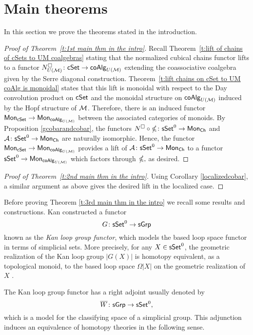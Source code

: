 
\section{Main theorems}

In this section we prove the theorems stated in the introduction. 

\begin{proof}[Proof of Theorem~\ref{t:1st main thm in the intro}]
    Recall Theorem~\ref{t:lift of chains of cSets to UM coalgebras} stating that the normalized cubical chains functor lifts to a functor $N^{\square}_{U(\mathcal{M})} \colon \mathsf{cSet} \to \mathsf{coAlg}_{U(\mathcal{M})}$ extending the coassociative coalgebra given by the Serre diagonal construction.
    Theorem~\ref{t:lift chains on cSet to UM coAlg is monoidal} states that this lift is  monoidal with respect to the Day convolution product on $\mathsf{cSet}$ and the monoidal structure on $\mathsf{coAlg}_{U(\mathcal{M})}$ induced by the Hopf structure of $\mathcal{M}$.
    Therefore, there is an induced functor $\mathsf{Mon}_{\mathsf{cSet}} \to \mathsf{Mon}_{\mathsf{coAlg}_{U(\mathcal{M})}}$ between the associated categories of monoids.
    By Proposition \ref{gcobarandcobar}, the functors $N^{\square} \circ \mathbb{\Omega} \colon \mathsf{sSet}^0 \to \mathsf{Mon}_{\mathsf{Ch}}$ and $\mathcal{A} \colon \mathsf{sSet}^0 \to \mathsf{Mon}_{\mathsf{Ch}}$ are naturally isomorphic.
    Hence, the functor $\mathsf{Mon}_{\mathsf{cSet}} \to \mathsf{Mon}_{\mathsf{coAlg}_{U(\mathcal{M})}}$ provides a lift of $\mathcal{A} \colon \mathsf{sSet}^0 \to \mathsf{Mon}_{\mathsf{Ch}}$ to a functor  $\mathsf{sSet}^0 \to \mathsf{Mon}_{\mathsf{coAlg}_{U(\mathcal{M})}}$ which factors through $\mathbb{\Omega},$ as desired.
\end{proof}

\begin{proof}[Proof of Theorem~\ref{t:2nd main thm in the intro}]
Using Corollary \ref{localizedcobar}, a similar argument as above gives the desired lift in the localized case. 
\end{proof}

Before proving Theorem \ref{t:3rd main thm in the intro} we recall some results and constructions. 
Kan constructed a functor $$G\colon \mathsf{sSet}^0 \to \mathsf{sGrp}$$ known as the \textit{Kan loop group functor}, which models the based loop space functor in terms of simplicial sets. More precisely, for any $X \in \mathsf{sSet}^0$, the geometric realization of the Kan loop group $|G(X)|$ is homotopy equivalent, as a topological monoid, to the based loop space $\Omega|X|$ on the geometric realization of $X$ \cite{Berger}. 


The Kan loop group functor has a right adjoint usually denoted by 
$$\overline{W} \colon \mathsf{sGrp} \to \mathsf{sSet}^0,$$ which is a model for the classifying space of a simplicial group. This adjunction induces an equivalence of homotopy theories in the following sense.

